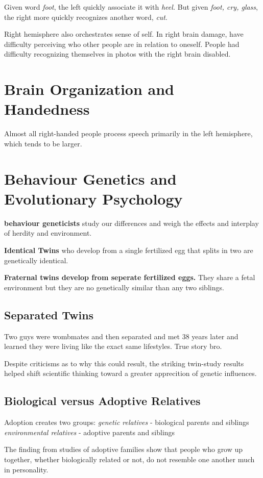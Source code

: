 Given word \textit{foot}, the left quickly associate it with \textit{heel.} But given \textit{foot, cry, glass}, the right more quickly recognizes another word, \textit{cut}. 

Right hemisphere also orchestrates sense of self. In right brain damage, have difficulty perceiving who other people are in relation to oneself. People had difficulty recognizing themselves in photos with the right brain disabled.

\section*{Brain Organization and Handedness}
Almost all right-handed people process speech primarily in the left hemisphere, which tends to be larger. 

\section*{Behaviour Genetics and Evolutionary Psychology}
\textbf{behaviour geneticists} study our differences and weigh the effects and interplay of herdity and environment.

\textbf{Identical Twins} who develop from a single fertilized egg that splits in two are genetically identical. 

\textbf{Fraternal twins develop from seperate fertilized eggs.} They share a fetal environment but they are no genetically similar than any two siblings.

\subsection*{Separated Twins}
Two guys were wombmates and then separated and met 38 years later and learned they were living like the exact same lifestyles. True story bro.

Despite criticisms as to why this could result, the striking twin-study results helped shift scientific thinking toward a greater apprecition of genetic influences.

\subsection*{Biological versus Adoptive Relatives}
Adoption creates two groups:
\textit{genetic relatives} - biological parents and siblings
\textit{environmental relatives} - adoptive parents and siblings

The finding from studies of adoptive families show that people who grow up together, whether biologically related or not, do not resemble one another much in personality. 

